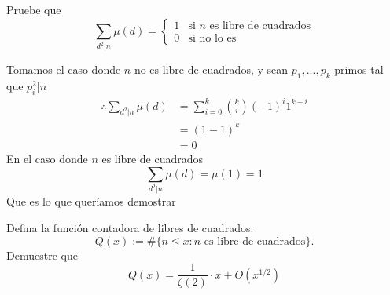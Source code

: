 \begin{prob}[3 pts.]
	Pruebe que
	\[\sum_{d^2|n}\mu(d)=\begin{cases}
			1 & \text{si $n$ es libre de cuadrados} \\
			0 & \text{si no lo es}
		\end{cases}\]
\end{prob}

\begin{sol}
    Tomamos el caso donde $n$ no es libre de cuadrados, y sean $p_1,...,p_k$ primos tal que $p_i^2|n$
    \begin{align*}
        \therefore\sum_{d^2|n}\mu(d)&=\sum_{i=0}^k\binom{k}{i}(-1)^i1^{k-i}\\
        &=(1-1)^k\\
        &=0
    \end{align*}
    En el caso donde $n$ es libre de cuadrados
    \[\sum_{d^2|n}\mu(d)=\mu(1)=1\]
    Que es lo que queríamos demostrar
\end{sol}

\begin{prob}[4 pts.]
	Defina la función contadora de libres de cuadrados:
	\[Q(x):=\#\{n\leq x: n\text{ es libre de cuadrados}\}.\]
	Demuestre que
	\[Q(x)=\frac{1}{\zeta(2)}\cdot x+O(x^{1/2})\]
\end{prob}

